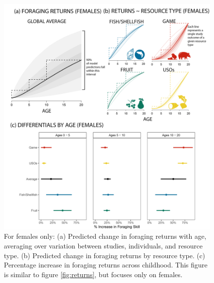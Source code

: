 \begin{figure}[h]
\centering
\includegraphics[width=12cm] {text/images/supplementary/by_resource_supp_returns_female.png}
\renewcommand{\thefigure}{S\arabic{figure}}
\caption{For females only: (a) Predicted change in foraging returns with age, averaging over variation between studies, individuals, and resource type. (b) Predicted change in foraging returns by resource type. (c) Percentage increase in foraging returns across childhood. This figure is similar to figure \ref{fig:returns}, but focuses only on females.}
\label{fig:females_only}
\end{figure}

